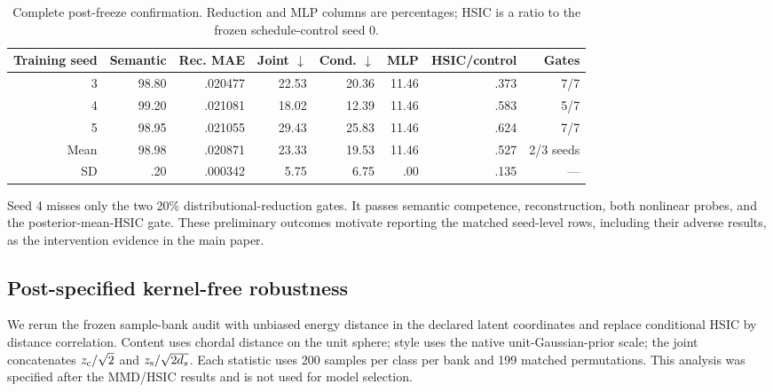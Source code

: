 \begin{table}[ht]
\caption{Complete post-freeze confirmation.  Reduction and MLP columns are
percentages; HSIC is a ratio to the frozen schedule-control seed 0.}
\label{tab:fact-postfreeze}
\centering
\scriptsize
\setlength{\tabcolsep}{3.5pt}
\begin{tabular}{rrrrrrrr}
\toprule
Training seed & Semantic & Rec. MAE & Joint $\downarrow$ & Cond. $\downarrow$ & MLP & HSIC/control & Gates \\
\midrule
3 & 98.80 & .020477 & 22.53 & 20.36 & 11.46 & .373 & 7/7 \\
4 & 99.20 & .021081 & 18.02 & 12.39 & 11.46 & .583 & 5/7 \\
5 & 98.95 & .021055 & 29.43 & 25.83 & 11.46 & .624 & 7/7 \\
\midrule
Mean & 98.98 & .020871 & 23.33 & 19.53 & 11.46 & .527 & 2/3 seeds \\
SD & .20 & .000342 & 5.75 & 6.75 & .00 & .135 & --- \\
\bottomrule
\end{tabular}
\end{table}

Seed 4 misses only the two 20\% distributional-reduction gates.  It passes
semantic competence, reconstruction, both nonlinear probes, and the
posterior-mean-HSIC gate.  These preliminary outcomes motivate reporting the
matched seed-level rows, including their adverse results, as the intervention
evidence in the main paper.

\subsection{Post-specified kernel-free robustness}
\label{app:fact-kernel-robustness}

We rerun the frozen sample-bank audit with unbiased energy distance in the
declared latent coordinates and replace conditional HSIC by distance
correlation.  Content uses chordal distance on the unit sphere; style uses the
native unit-Gaussian-prior scale; the joint concatenates
$z_{\mathrm{c}}/\sqrt{2}$ and $z_{\mathrm{s}}/\sqrt{2d_s}$.  Each statistic uses 200 samples per
class per bank and 199 matched permutations.  This analysis was specified
after the MMD/HSIC results and is not used for model selection.

